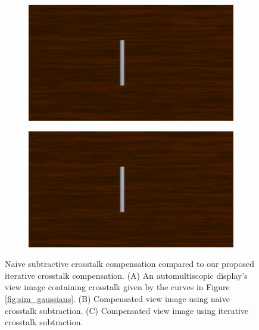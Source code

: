 \begin{figure}[htbp]
    \begin{subfigure}[b]{0.48\textwidth}
        \includegraphics[width=\textwidth]{./Template_Figures/subtractive_comp}
        \caption{}\label{fig:subtractive_lf}
    \end{subfigure}
    \begin{subfigure}[b]{0.48\textwidth}
        \includegraphics[width=\textwidth]{./Template_Figures/iterative_comp}
        \caption{}\label{fig:iterative_lf}
    \end{subfigure}

    \caption{Naive subtractive crosstalk compensation compared to our proposed iterative crosstalk compensation. (A) An automultiscopic display's view image containing crosstalk given by the curves in Figure \ref{fig:sim_gaussians}. (B) Compensated view image using naive crosstalk subtraction. (C) Compensated view image using iterative crosstalk subtraction. \label{fig:iterative_tech}}
\end{figure}


